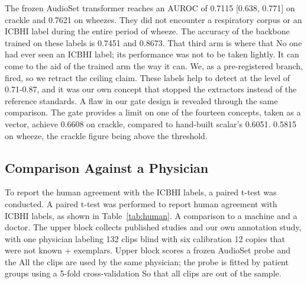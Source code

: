 \documentclass[journal,onecolumn]{IEEEtran}
\begin{document}
The frozen AudioSet transformer reaches an AUROC of 0.7115 [0.638, 0.771] on crackle and 0.7621 on wheezes. They did not encounter a respiratory corpus or an ICBHI label during the entire period of wheeze.
The accuracy of the backbone trained on these labels is 0.7451 and 0.8673. That third arm is where that
No one had ever seen an ICBHI label; its performance was not to be taken lightly.
It can come to the aid of the trained arm the way it can. We, as a pre-registered branch, fired, so we retract the ceiling claim. These labels help to detect at the level of 0.71-0.87, and it was our own concept that stopped the extractors instead of the reference standards. A flaw in our gate design is revealed through the same comparison. The gate provides a limit on one of the fourteen concepts, taken as a vector, achieve 0.6608 on crackle, compared to hand-built scalar's 0.6051.
0.5815 on wheeze, the crackle figure being above the threshold.

\subsection{Comparison Against a Physician}
\label{subsec:human}

To report the human agreement with the ICBHI labels, a paired t-test was conducted. A paired t-test was performed to report human agreement with ICBHI labels, as shown in Table~\ref{tab:human}.
A comparison to a machine and a doctor. The upper block collects published studies and our
own annotation study, with one physician labeling 132 clips blind with six calibration
12 copies that were not known + exemplars. Upper block scores a frozen AudioSet probe and the
All the clips are used by the same physician; the probe is fitted by patient groups using a 5-fold cross-validation
So that all clips are out of the sample.
\end{document}

